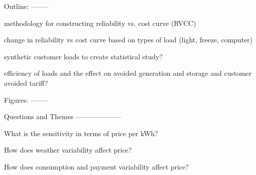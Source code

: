 \documentclass{article}
\begin{document}
Outline:
--------

methodology for constructing reliability vs. cost curve (RVCC)

change in reliability vs cost curve based on types of load (light,
freeze, computer)

synthetic customer loads to create statistical study?

efficiency of loads and the effect on avoided generation and storage and
customer avoided tariff?




Figures:
--------







Questions and Themes
--------------------

What is the sensitivity in terms of price per kWh?

How does weather variability affect price?

How does consumption and payment variability affect price?
\end{document}
